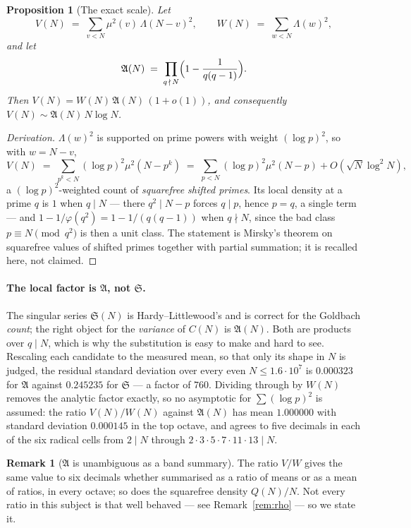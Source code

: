 \documentclass[11pt,a4paper]{article}
\theoremstyle{plain}
\newtheorem{proposition}[theorem]{Proposition}
\theoremstyle{definition}
\newtheorem{remark}[theorem]{Remark}
\renewcommand{\SS}{\mathfrak{S}}
\newcommand{\AAA}{\mathfrak{A}}
\begin{document}
\begin{proposition}[The exact scale]\label{prop:V}
Let
\[
  V(N) \;=\; \sum_{v<N}\mu^2(v)\,\Lambda(N-v)^2,
  \qquad
  W(N) \;=\; \sum_{w<N}\Lambda(w)^2,
\]
and let
\[
  \AAA(N) \;=\; \prod_{q\,\nmid\,N}\Bigl(1-\frac{1}{q(q-1)}\Bigr).
\]
Then $V(N) = W(N)\,\AAA(N)\,(1+o(1))$, and consequently
$V(N) \sim \AAA(N)\,N\log N$.
\end{proposition}

\begin{proof}[Derivation]
$\Lambda(w)^2$ is supported on prime powers with weight $(\log p)^2$,
so with $w=N-v$,
\[
  V(N) \;=\; \sum_{p^k<N}(\log p)^2\mu^2(N-p^k)
        \;=\; \sum_{p<N}(\log p)^2\mu^2(N-p) + O(\sqrt N\log^2 N),
\]
a $(\log p)^2$-weighted count of \emph{squarefree shifted primes}. Its
local density at a prime $q$ is $1$ when $q\mid N$ --- there
$q^2\mid N-p$ forces $q\mid p$, hence $p=q$, a single term --- and
$1-1/\varphi(q^2) = 1-1/(q(q-1))$ when $q\nmid N$, since the bad class
$p\equiv N \pmod{q^2}$ is then a unit class. The statement is Mirsky's
theorem on squarefree values of shifted primes \cite{Mir49} together
with partial summation; it is recalled here, not claimed.
\end{proof}

\paragraph{The local factor is $\AAA$, not $\SS$.}
The singular series $\SS(N)$ is Hardy--Littlewood's and is correct for
the Goldbach \emph{count}; the right object for the \emph{variance} of
$C(N)$ is $\AAA(N)$. Both are products over $q\mid N$, which is why
the substitution is easy to make and hard to see. Rescaling each
candidate to the measured mean, so that only its shape in $N$ is
judged, the residual standard deviation over every even
$N\le 1.6\cdot10^7$ is $0.000323$ for $\AAA$ against $0.245235$ for
$\SS$ --- a factor of $760$. Dividing through by $W(N)$ removes the
analytic factor exactly, so no asymptotic for $\sum(\log p)^2$ is
assumed: the ratio $V(N)/W(N)$ against $\AAA(N)$ has mean $1.000000$
with standard deviation $0.000145$ in the top octave, and agrees to
five decimals in each of the six radical cells from $2\mid N$ through
$2\cdot3\cdot5\cdot7\cdot11\cdot13\mid N$.

\begin{remark}[$\AAA$ is unambiguous as a band summary]
The ratio $V/W$ gives the same value to six decimals whether summarised
as a ratio of means or as a mean of ratios, in every octave; so does
the squarefree density $Q(N)/N$. Not every ratio in this subject is
that well behaved --- see Remark~\ref{rem:rho} --- so we state it.
\end{remark}
\end{document}
